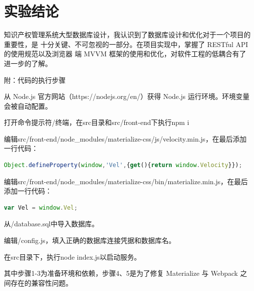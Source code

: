 \documentclass[a4paper, 12pt]{article}
\begin{document}
	\section{\large\textbf 实验结论}

	知识产权管理系统大型数据库设计，我认识到了数据库设计和优化对于一个项目的重要性，是
	十分关键、不可忽视的一部分。在项目实现中，掌握了 RESTful API 的使用规范以及浏览器
	端 MVVM 框架的使用和优化，对软件工程的低耦合有了进一步的了解。

	\newpage
	\noindent 附：代码的执行步骤
	{
		\begin{enumerate} 
		{\setlength{\parskip}{-0.3em}
			\item 从 Node.js 官方网站（{\inlinecode https://nodejs.org/en/}）获得 Node.js 运行环境。环境变量会被自动配置。
			\item 打开命令提示符/终端，在{\inlinecode src}目录和{\inlinecode src/front-end}下执行{\inlinecode npm i}
			\item 编辑{\inlinecode src/front-end/node\_modules/materialize-css/js/velocity.min.js}，在最后添加一行代码：
				\begin{lstlisting}[language=javascript, basicstyle=\small\lstfont, showstringspaces=false]
Object.defineProperty(window,'Vel',{get(){return window.Velocity}});
				\end{lstlisting}
			\item 编辑{\inlinecode src/front-end/node\_modules/materialize-css/bin/materialize.min.js}，在最后添加一行代码：
				\begin{lstlisting}[language=javascript, basicstyle=\small\lstfont, showstringspaces=false]
var Vel = window.Vel;
				\end{lstlisting}
			\item 从{\inlinecode /database.sql}中导入数据库。
			\item 编辑{\inlinecode /config.js}，填入正确的数据库连接凭据和数据库名。
			\item 在{\inlinecode src}目录下，执行{\inlinecode node index.js}以启动服务。
		}
		\end{enumerate}
	}
	其中步骤1-3为准备环境和依赖，步骤4、5是为了修复 Materialize 与 Webpack 之间存在的兼容性问题。
\end{document}
